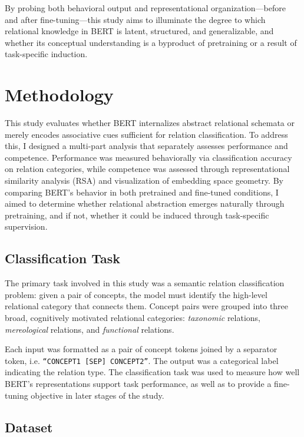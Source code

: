 \documentclass[stu,floatsintext]{apa7}
\begin{document}
By probing both behavioral output and representational organization—before and after fine-tuning—this study aims to illuminate the degree to which relational knowledge in BERT is latent, structured, and generalizable, and whether its conceptual understanding is a byproduct of pretraining or a result of task-specific induction.

\section{Methodology}

This study evaluates whether BERT internalizes abstract relational schemata or merely encodes associative cues sufficient for relation classification. To address this, I designed a multi-part analysis that separately assesses performance and competence. Performance was measured behaviorally via classification accuracy on relation categories, while competence was assessed through representational similarity analysis (RSA) and visualization of embedding space geometry. By comparing BERT's behavior in both pretrained and fine-tuned conditions, I aimed to determine whether relational abstraction emerges naturally through pretraining, and if not, whether it could be induced through task-specific supervision.

\subsection{Classification Task}

The primary task involved in this study was a semantic relation classification problem: given a pair of concepts, the model must identify the high-level relational category that connects them. Concept pairs were grouped into three broad, cognitively motivated relational categories: \textit{taxonomic} relations, \textit{mereological} relations, and \textit{functional} relations.

Each input was formatted as a pair of concept tokens joined by a separator token, i.e. \texttt{``CONCEPT1 [SEP] CONCEPT2''}. The output was a categorical label indicating the relation type. The classification task was used to measure how well BERT's representations support task performance, as well as to provide a fine-tuning objective in later stages of the study.

\subsection{Dataset}
\end{document}
